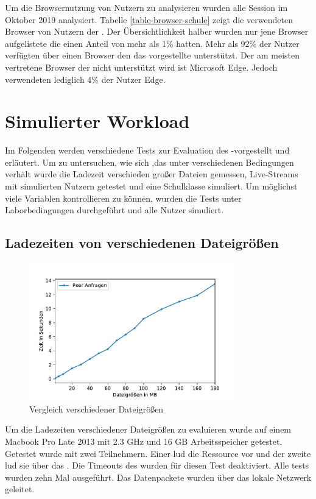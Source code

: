 Um die Browsernutzung von \schulCloud Nutzern zu analysieren wurden alle Session im Oktober 2019 analysiert. Tabelle \ref{table-browser-schule} zeigt die verwendeten Browser von Nutzern der \schulCloud. Der Übersichtlichkeit halber wurden nur jene Browser aufgelistete die einen Anteil von mehr als 1\% hatten. Mehr als 92\% der Nutzer verfügten über einen Browser den das vorgestellte \pTp \cdn unterstützt. Der am meisten vertretene Browser der nicht unterstützt wird ist Microsoft Edge. Jedoch verwendeten lediglich 4\% der Nutzer Edge.
 
\section{Simulierter Workload}\label{e:sim}

Im Folgenden werden verschiedene Tests zur Evaluation des \pTp-\cdns vorgestellt und erläutert. Um zu untersuchen, wie sich ,das \cdn unter verschiedenen Bedingungen verhält wurde die Ladezeit verschieden großer Dateien gemessen, Live-Streams mit simulierten Nutzern getestet und eine Schulklasse simuliert. Um möglichst viele Variablen kontrollieren zu können, wurden die Tests unter Laborbedingungen durchgeführt und alle Nutzer simuliert.

\subsection{Ladezeiten von verschiedenen Dateigrößen} \label{e:filesize}
\begin{figure}[!h]
	\centering
	\includegraphics[width=0.8\textwidth]{figures/Timing_file_size}
	\caption[Vergleich verschiedener Dateigrößen]{Vergleich verschiedener Dateigrößen}
	\label{fig:timing_file_size}
\end{figure}

Um die Ladezeiten verschiedener Dateigrößen zu evaluieren wurde auf einem Macbook Pro Late 2013 mit 2.3 GHz und 16 GB Arbeitsspeicher getestet. 
Getestet wurde mit zwei Teilnehmern. Einer lud die Ressource vor und der zweite lud sie über das \pTp \cdn. Die Timeouts des \pTp \cdns wurden für diesen Test deaktiviert. Alle tests wurden zehn Mal ausgeführt. Das \pTp Datenpackete wurden über das lokale Netzwerk geleitet.

